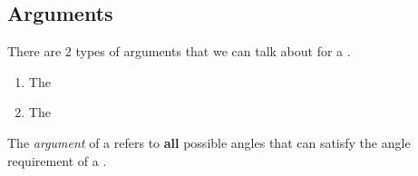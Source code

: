 \subsection{Arguments}\label{subsec:Complex_Number_Arguments}
There are 2 types of arguments that we can talk about for a .
\begin{enumerate}[noitemsep]
\item The 
\item The 
\end{enumerate}

\begin{definition}[Argument]\label{def:Complex_Number_Argument}
  The \emph{argument} of a  refers to \textbf{all} possible angles that can satisfy the angle requirement of a .
\end{definition}


